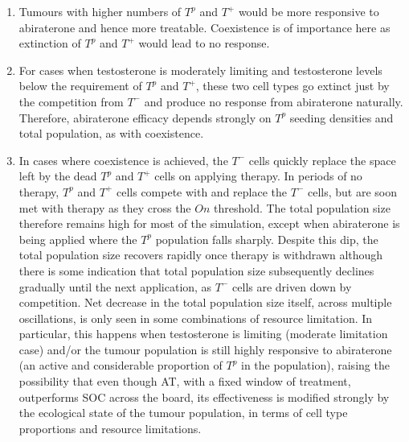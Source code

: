 \begin{enumerate}
  \item Tumours with higher numbers of $T^p$ and $T^+$ would be more responsive to abiraterone and hence more treatable. Coexistence is of importance here as extinction of $T^p$ and $T^+$ would lead to no response.
  \item For cases when testosterone is moderately limiting and testosterone levels below the requirement of $T^p$ and $T^+$, these two cell types go extinct just by the competition from $T^-$ and produce no response from abiraterone naturally. Therefore, abiraterone efficacy depends strongly on $T^p$ seeding densities and total population, as with coexistence.
  \item In cases where coexistence is achieved, the $T^-$ cells quickly replace the space left by the dead $T^p$ and $T^+$ cells on applying therapy. In periods of no therapy, $T^p$ and $T^+$ cells compete with and replace the $T^-$ cells, but are soon met with therapy as they cross the $On$ threshold. The total population size therefore remains high for most of the simulation, except when abiraterone is being applied where the $T^p$ population falls sharply. Despite this dip, the total population size recovers rapidly once therapy is withdrawn although there is some indication that total population size subsequently declines gradually until the next application, as $T^-$ cells are driven down by competition. Net decrease in the total population size itself, across multiple oscillations, is only seen in some combinations of resource limitation. In particular, this happens when testosterone is limiting (moderate limitation case) and/or the tumour population is still highly responsive to abiraterone (an active and considerable proportion of $T^p$ in the population), raising the possibility that even though AT, with a fixed window of treatment, outperforms SOC across the board, its effectiveness is modified strongly by the ecological state of the tumour population, in terms of cell type proportions and resource limitations.
\end{enumerate}

